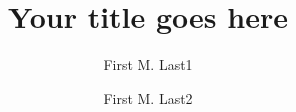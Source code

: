 \documentclass[final,1p,times]{elsarticle}
\begin{document}
\begin{frontmatter}
\begin{itemize}
\end{itemize}

\title{\textbf{Your title goes here}}  %


\author[fml1]{First M. Last1}
\author[fml2]{First M. Last2}


\address[fml1]{Institution1, Mail Stop1, Street Address1, City1, State1, Zip Code1, Country1, phone number1}
\address[fml2]{Institution2, Mail Stop2, Street Address2, City2, State2, Zip Code2, Country2, phone number2}




\end{frontmatter}

%
%



\vspace{0.25in}

%
%

\end{document}
